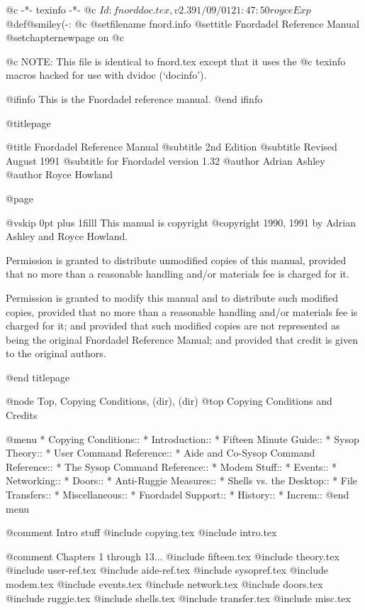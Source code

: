    @c -*- texinfo -*-
@c $Id: fnorddoc.tex,v 2.3 91/09/01 21:47:50 royce Exp $
@def@smiley{(-:}
@c %
@setfilename fnord.info
@settitle Fnordadel Reference Manual
@setchapternewpage on
@c %

@c NOTE: This file is identical to fnord.tex except that it uses the
@c texinfo macros hacked for use with dvidoc (`docinfo').

@ifinfo
This is the Fnordadel reference manual.
@end ifinfo

@titlepage

@title Fnordadel Reference Manual
@subtitle 2nd Edition
@subtitle Revised August 1991
@subtitle for Fnordadel version 1.32
@author Adrian Ashley
@author Royce Howland

@page

@vskip 0pt plus 1filll
This manual is copyright @copyright{} 1990, 1991
by Adrian Ashley and Royce Howland.

Permission is granted to distribute unmodified copies of this manual,
provided that no more than a reasonable handling and/or materials fee is
charged for it.

Permission is granted to modify this manual and to distribute such modified
copies, provided that no more than a reasonable handling and/or materials
fee is charged for it; and provided that such modified copies are not
represented as being the original Fnordadel Reference Manual; and provided
that credit is given to the original authors.

@end titlepage

@node Top, Copying Conditions, (dir), (dir)
@top Copying Conditions and Credits

@menu
* Copying Conditions::		
* Introduction::		
* Fifteen Minute Guide::	
* Sysop Theory::		
* User Command Reference::	
* Aide and Co-Sysop Command Reference::  
* The Sysop Command Reference::	 
* Modem Stuff::			
* Events::			
* Networking::			
* Doors::			
* Anti-Ruggie Measures::	
* Shells vs. the Desktop::	
* File Transfers::		
* Miscellaneous::		
* Fnordadel Support::		
* History::			
* Increm::			
@end menu

@comment Intro stuff
@include copying.tex
@include intro.tex

@comment Chapters 1 through 13...
@include fifteen.tex
@include theory.tex
@include user-ref.tex
@include aide-ref.tex
@include sysopref.tex
@include modem.tex
@include events.tex
@include network.tex
@include doors.tex
@include ruggie.tex
@include shells.tex
@include transfer.tex
@include misc.tex

